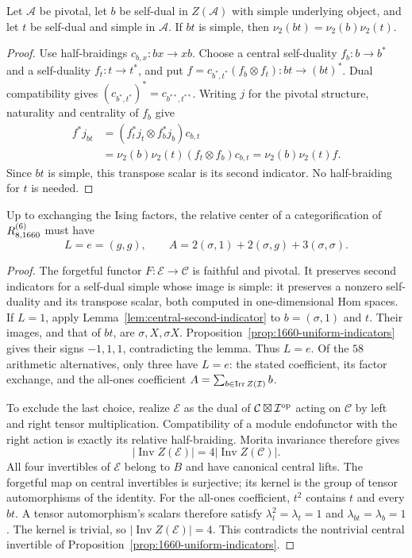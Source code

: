 \begin{lemma}
\label{lem:central-second-indicator}
Let $\mathcal A$ be pivotal, let $b$ be self-dual in $Z(\mathcal A)$
with simple underlying object, and let $t$ be self-dual and simple in
$\mathcal A$. If $bt$ is simple, then
$\nu_2(bt)=\nu_2(b)\nu_2(t)$.
\end{lemma}
\begin{proof}
Use half-braidings $c_{b,x}:bx\to xb$. Choose a central self-duality
$f_b:b\to b^*$ and a self-duality $f_t:t\to t^*$, and put
$f=c_{b^*,t^*}(f_b\otimes f_t):bt\to(bt)^*$.
Dual compatibility gives $(c_{b^*,t^*})^*=c_{b^{**},t^{**}}$.
Writing $j$ for the pivotal structure, naturality and centrality of
$f_b$ give
\begin{align*}
 f^*j_{bt}
 &=(f_t^*j_t\otimes f_b^*j_b)c_{b,t}\\
 &=\nu_2(b)\nu_2(t)(f_t\otimes f_b)c_{b,t}
 =\nu_2(b)\nu_2(t)f.
\end{align*}
Since $bt$ is simple, this transpose scalar is its second indicator.
No half-braiding for $t$ is needed.
\end{proof}

\begin{theorem}
\label{thm:1660-single-relative-ring}
Up to exchanging the Ising factors, the relative center of a
categorification of $R^{(6)}_{8,1660}$ must have
\[
 L=e=(g,g),\qquad
 A=2(\sigma,1)+2(\sigma,g)+3(\sigma,\sigma).
\]
\end{theorem}
\begin{proof}
The forgetful functor $F:\mathcal E\to\mathcal C$ is faithful and
pivotal. It preserves second indicators for a self-dual simple whose
image is simple: it preserves a nonzero self-duality and its transpose
scalar, both computed in one-dimensional Hom spaces.
If $L=1$, apply Lemma~\ref{lem:central-second-indicator} to
$b=(\sigma,1)$ and $t$. Their images, and that of $bt$, are
$\sigma,X,\sigma X$. Proposition~\ref{prop:1660-uniform-indicators}
gives their signs $-1,1,1$, contradicting the lemma. Thus $L=e$.
Of the $58$ arithmetic alternatives, only three have $L=e$: the
stated coefficient, its factor exchange, and the all-ones coefficient
$A=\sum_{b\in\operatorname{Irr} Z(\mathcal I)}b$.

To exclude the last choice, realize $\mathcal E$ as the dual of
$\mathcal C\boxtimes\mathcal I^{\rm op}$ acting on $\mathcal C$ by
left and right tensor multiplication. Compatibility of a module
endofunctor with the right action is exactly its relative half-braiding.
Morita invariance therefore gives
\[
 |\operatorname{Inv}Z(\mathcal E)|
       =4|\operatorname{Inv}Z(\mathcal C)|.
\]
All four invertibles of $\mathcal E$ belong to $B$ and have canonical
central lifts. The forgetful map on central invertibles is surjective;
its kernel is the group of tensor automorphisms of the identity.
For the all-ones coefficient, $t^2$ contains $t$ and every $bt$.
A tensor automorphism's scalars therefore satisfy
$\lambda_t^2=\lambda_t=1$ and $\lambda_{bt}=\lambda_b=1$.
The kernel is trivial, so $|\operatorname{Inv}Z(\mathcal E)|=4$.
This contradicts the nontrivial central invertible of
Proposition~\ref{prop:1660-uniform-indicators}.
\end{proof}

